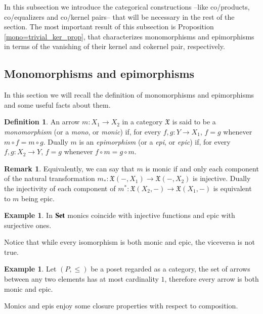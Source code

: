 \documentclass[12pt]{article}
\theoremstyle{definition}
\newtheorem{definition}[lemma]{Definition}
\newtheorem{remark}[lemma]{Remark}
\newtheorem{example}[lemma]{Example}
\def\X{\mathfrak X}
\newcommand{\Set}{\textbf{\textup{Set}}}
\numberwithin{equation}{section}
\begin{document}
 In this subsection we introduce the categorical constructions --like co/products, co/equalizers and co/kernel pairs-- that will be necessary in the rest of the section. The most important result of this subsection is Proposition \ref{mono=trivial_ker_prop}, that characterizes monomorphisms and epimorphisms in terms of the vanishing of their kernel and cokernel pair, respectively. 

\subsection{Monomorphisms and epimorphisms}
\reversemarginpar {} \normalmarginpar
In this section we will recall the definition of monomorphisms and epimorphisms and some useful facts about them. 

\begin{definition}
	An arrow $m:X_1\rightarrow X_2$ in a category $\X$ is said to be a \emph{monomorphism} (or a \emph{mono}, or \emph{monic}) if, for every $f,g:Y\rightarrow X_1$, $f=g$ whenever $m\circ f=m\circ g$. Dually $m$ is an \emph{epimorphism} (or a \emph{epi}, or \emph{epic}) if, for every $f,g:X_2\rightarrow Y$, $f=g$ whenever $f\circ m=g\circ m$.
 \end{definition}

\begin{remark}
	Equivalently, we can say that $m$ is monic if and only each component of the natural transformation $m_*:\X(-, X_1)\rightarrow \X(-, X_2)$ is injective. Dually the injectivity of each component of  $m^*:\X(X_2, -) \rightarrow \X(X_1, -)$  is equivalent to $m$ being epic.
\end{remark}

\begin{example}\label{sets}
	In $\Set$ monics coincide with injective functions and epic with surjective ones.
\end{example} 

Notice that while every isomorphism is both monic and epic, the viceversa is not true.

\begin{example}\label{pos}
	Let $(P, \leq)$ be a poset regarded as a category, the set of arrows between any two elements has at most cardinality $1$, therefore every arrow is both monic and epic.
\end{example}
Monics and epis enjoy some closure properties with respect to composition.
\end{document}
